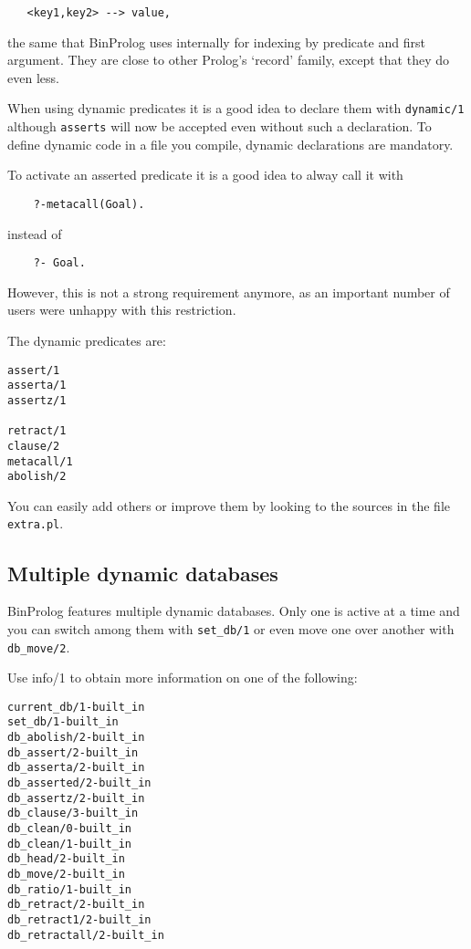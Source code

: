 \documentclass{article}
\begin{document}
\begin{verbatim}
   <key1,key2> --> value,
\end{verbatim}

the same that BinProlog uses internally for indexing by predicate and
first argument.  They are close to other Prolog's `record' family,
except that they do even less.

When using dynamic predicates it is a good idea
to declare them with {\tt dynamic/1}
although {\tt asserts} will now be accepted even without such a
declaration. To define dynamic code in a file you compile,
dynamic declarations are mandatory.

To activate an asserted predicate it is a good idea
to alway call it with

\begin{verbatim}
	?-metacall(Goal).
\end{verbatim}

{\flushleft instead} of 

\begin{verbatim}
	?- Goal.
\end{verbatim}

However, this is not a strong requirement anymore,
as an important number of users were unhappy with this restriction.

The dynamic predicates are:

\begin{verbatim}
assert/1
asserta/1
assertz/1

retract/1
clause/2
metacall/1
abolish/2
\end{verbatim}

You can easily add others or improve them by looking to the sources
in the file {\tt extra.pl}.

\subsection{Multiple dynamic databases}

BinProlog  features multiple dynamic databases. Only one is
active at a time and you can switch among them with {\tt set\_db/1}
or even move one over another with {\tt db\_move/2}.

Use info/1 to obtain more information on one of the following:

\begin{verbatim}
current_db/1-built_in
set_db/1-built_in
db_abolish/2-built_in
db_assert/2-built_in
db_asserta/2-built_in
db_asserted/2-built_in
db_assertz/2-built_in
db_clause/3-built_in
db_clean/0-built_in
db_clean/1-built_in
db_head/2-built_in
db_move/2-built_in
db_ratio/1-built_in
db_retract/2-built_in
db_retract1/2-built_in
db_retractall/2-built_in
\end{verbatim}
\end{document}
